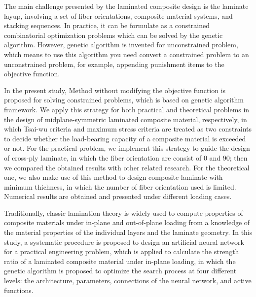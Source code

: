 The main challenge presented by the laminated composite design is the laminate
layup, involving a set of fiber orientations, composite material systems, and
stacking sequences. In practice, it can be formulate as a constrained
combinatorial optimization problems which can be solved by the genetic
algorithm. However, genetic algorithm is invented for unconstrained problem,
which means to use this algorithm you need convert a constrained problem to an
unconstrained problem, for example, appending punishment items to the objective
function. 

In the present study, Method without modifying the objective function is  
proposed for solving constrained problems, which is based on genetic algorithm
framework. We apply this strategy for both practical and theoretical problems in
the design of midplane-symmetric laminated composite material, respectively, in
which Tsai-wu criteria and maximum stress criteria are treated as two
constraints to decide whether the load-bearing capacity of a composite material
is exceeded or not. For the practical problem, we implement this strategy to
guide the design of cross-ply laminate, in which the fiber orientation are
consist of 0 and 90; then we compared the obtained results with other related
research. For the theoretical one, we also make use of this method to design
composite laminate with minimum thichness, in which the number of fiber
orientation used is limited. Numerical results are obtained and presented under
different loading cases.

Traditionally, classic lamination theory is widely used to compute
properties of composite materials under in-plane and out-of-plane loading from
a knowledge of the material properties of the individual layers and the
laminate geometry. In this study, a systematic procedure is proposed to design
an artificial neural network for a practical engineering problem, which is
applied to calculate the strength ratio of a laminated composite material under
in-plane loading, in which the genetic algorithm is proposed to optimize the search
process at four different levels: the architecture, parameters, connections of
the neural network, and active functions. 


